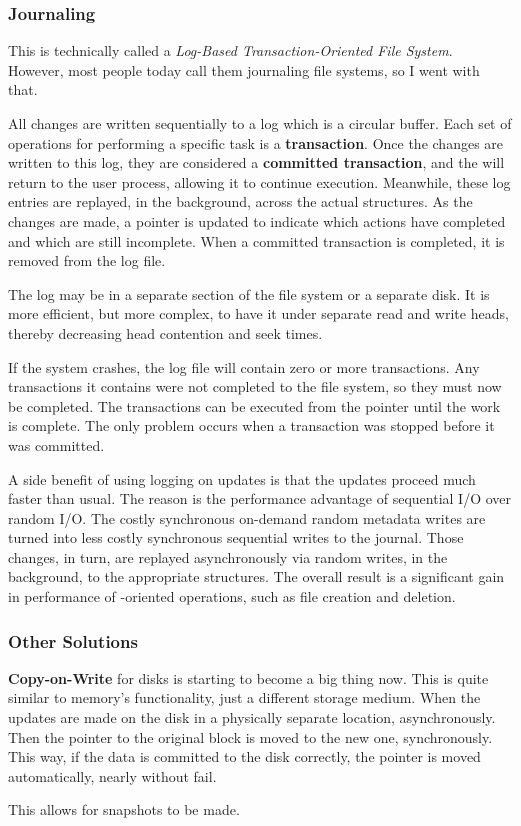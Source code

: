 \subsubsection{Journaling}\label{subsubsec:Journaling}
This is technically called a \emph{Log-Based Transaction-Oriented File System}.
However, most people today call them journaling file systems, so I went with that.

All  changes are written sequentially to a log which is a circular buffer.
Each set of operations for performing a specific task is a \textbf{transaction}.
Once the changes are written to this log, they are considered a \textbf{committed transaction}, and the  will return to the user process, allowing it to continue execution.
Meanwhile, these log entries are replayed, in the background, across the actual  structures.
As the changes are made, a pointer is updated to indicate which actions have completed and which are still incomplete.
When a committed transaction is completed, it is removed from the log file.

The log may be in a separate section of the file system or a separate disk.
It is more efficient, but more complex, to have it under separate read and write heads, thereby decreasing head contention and seek times.

If the system crashes, the log file will contain zero or more transactions.
Any transactions it contains were not completed to the file system, so they must now be completed.
The transactions can be executed from the pointer until the work is complete.
The only problem occurs when a transaction was stopped before it was committed.

A side benefit of using logging on  updates is that the updates proceed much faster than usual.
The reason is the performance advantage of sequential I/O over random I/O.
The costly synchronous on-demand random metadata writes are turned into less costly synchronous sequential writes to the journal.
Those changes, in turn, are replayed asynchronously via random writes, in the background, to the appropriate structures.
The overall result is a significant gain in performance of -oriented operations, such as file creation and deletion.

\subsubsection{Other Solutions}\label{subsubsec:Other_FS_Recovery_Solutions}
\textbf{Copy-on-Write} for disks is starting to become a big thing now.
This is quite similar to memory's  functionality, just a different storage medium.
When the updates are made on the disk in a physically separate location, asynchronously.
Then the pointer to the original block is moved to the new one, synchronously.
This way, if the data is committed to the disk correctly, the pointer is moved automatically, nearly without fail.

This allows for snapshots to be made.


